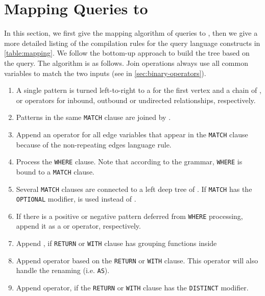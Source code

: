 \section{Mapping \opencypher Queries to \RGA}
\label{sec:compilation}

In this section, we first give the mapping algorithm of \opencypher queries to \rga, then we give a more detailed listing of the compilation rules for the query language constructs in \autoref{table:mapping}.
We follow the bottom-up approach to build the \rga tree based on the \opencypher query. The algorithm is as follows. Join operations always use all common variables to match the two inputs (see \jointext in \autoref{sec:binary-operators}).

\setlength\tabcolsep{3.6pt}
\begin{enumerate}
\label{alg:build-rga-tree}
	\item A single pattern is turned left-to-right to a \getverticestext for the first vertex and a chain of \expandintext, \expandouttext or \expandbothtext operators for inbound, outbound or undirected relationships, respectively.
	\item Patterns in the same \lstinline+MATCH+ clause are joined by \jointext.
	\item Append an \alldifferenttext operator for all edge variables that appear in the \lstinline+MATCH+ clause because of the non-repeating edges language rule.
	\item Process the \lstinline+WHERE+ clause. Note that according to the grammar, \lstinline+WHERE+ is bound to a \lstinline+MATCH+ clause.
	\item Several \lstinline+MATCH+ clauses are connected to a left deep tree of \jointext. If \lstinline+MATCH+ has the \lstinline+OPTIONAL+ modifier, \leftouterjointext is used instead of \jointext.
	\item If there is a positive or negative pattern deferred from \lstinline+WHERE+ processing,
		append it as a \jointext or \antijointext operator, respectively.
	\item Append \groupingtext, if \lstinline+RETURN+ or \lstinline+WITH+ clause has grouping functions inside
	\item Append \projectiontext operator based on the \lstinline+RETURN+ or \lstinline+WITH+ clause. This operator will also handle the renaming (i.e. \lstinline+AS+).
	\item Append \duplicateeliminationtext operator, if the \lstinline+RETURN+ or \lstinline+WITH+ clause has the \lstinline+DISTINCT+ modifier.

\end{enumerate}
